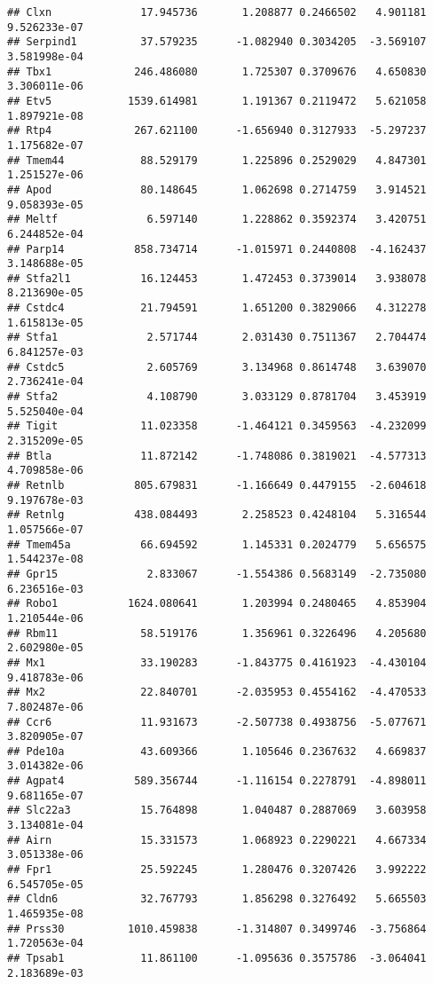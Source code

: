 \documentclass[
]{article}
\begin{document}
\begin{verbatim}
## Clxn              17.945736       1.208877 0.2466502   4.901181 9.526233e-07
## Serpind1          37.579235      -1.082940 0.3034205  -3.569107 3.581998e-04
## Tbx1             246.486080       1.725307 0.3709676   4.650830 3.306011e-06
## Etv5            1539.614981       1.191367 0.2119472   5.621058 1.897921e-08
## Rtp4             267.621100      -1.656940 0.3127933  -5.297237 1.175682e-07
## Tmem44            88.529179       1.225896 0.2529029   4.847301 1.251527e-06
## Apod              80.148645       1.062698 0.2714759   3.914521 9.058393e-05
## Meltf              6.597140       1.228862 0.3592374   3.420751 6.244852e-04
## Parp14           858.734714      -1.015971 0.2440808  -4.162437 3.148688e-05
## Stfa2l1           16.124453       1.472453 0.3739014   3.938078 8.213690e-05
## Cstdc4            21.794591       1.651200 0.3829066   4.312278 1.615813e-05
## Stfa1              2.571744       2.031430 0.7511367   2.704474 6.841257e-03
## Cstdc5             2.605769       3.134968 0.8614748   3.639070 2.736241e-04
## Stfa2              4.108790       3.033129 0.8781704   3.453919 5.525040e-04
## Tigit             11.023358      -1.464121 0.3459563  -4.232099 2.315209e-05
## Btla              11.872142      -1.748086 0.3819021  -4.577313 4.709858e-06
## Retnlb           805.679831      -1.166649 0.4479155  -2.604618 9.197678e-03
## Retnlg           438.084493       2.258523 0.4248104   5.316544 1.057566e-07
## Tmem45a           66.694592       1.145331 0.2024779   5.656575 1.544237e-08
## Gpr15              2.833067      -1.554386 0.5683149  -2.735080 6.236516e-03
## Robo1           1624.080641       1.203994 0.2480465   4.853904 1.210544e-06
## Rbm11             58.519176       1.356961 0.3226496   4.205680 2.602980e-05
## Mx1               33.190283      -1.843775 0.4161923  -4.430104 9.418783e-06
## Mx2               22.840701      -2.035953 0.4554162  -4.470533 7.802487e-06
## Ccr6              11.931673      -2.507738 0.4938756  -5.077671 3.820905e-07
## Pde10a            43.609366       1.105646 0.2367632   4.669837 3.014382e-06
## Agpat4           589.356744      -1.116154 0.2278791  -4.898011 9.681165e-07
## Slc22a3           15.764898       1.040487 0.2887069   3.603958 3.134081e-04
## Airn              15.331573       1.068923 0.2290221   4.667334 3.051338e-06
## Fpr1              25.592245       1.280476 0.3207426   3.992222 6.545705e-05
## Cldn6             32.767793       1.856298 0.3276492   5.665503 1.465935e-08
## Prss30          1010.459838      -1.314807 0.3499746  -3.756864 1.720563e-04
## Tpsab1            11.861100      -1.095636 0.3575786  -3.064041 2.183689e-03

\end{verbatim}
\end{document}
